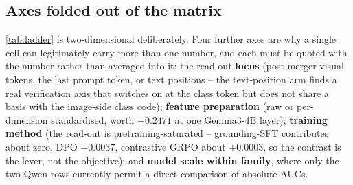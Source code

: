 \subsection{Axes folded out of the matrix}
\label{sec:exp_axes}

\cref{tab:ladder} is two-dimensional deliberately. Four further axes are why a
single cell can legitimately carry more than one number, and each must be
quoted with the number rather than averaged into it: the read-out
\textbf{locus} (post-merger visual tokens, the last prompt token, or text
positions -- the text-position arm finds a real verification axis that switches
on at the class token but does not share a basis with the image-side class
code); \textbf{feature preparation} (raw or per-dimension standardised, worth
$+0.2471$ at one Gemma3-4B layer); \textbf{training method} (the read-out is
pretraining-saturated -- grounding-SFT contributes about zero, DPO $+0.0037$,
contrastive GRPO about $+0.0003$, so the contrast is the lever, not the
objective); and \textbf{model scale within family}, where only the two Qwen
rows currently permit a direct comparison of absolute AUCs.



